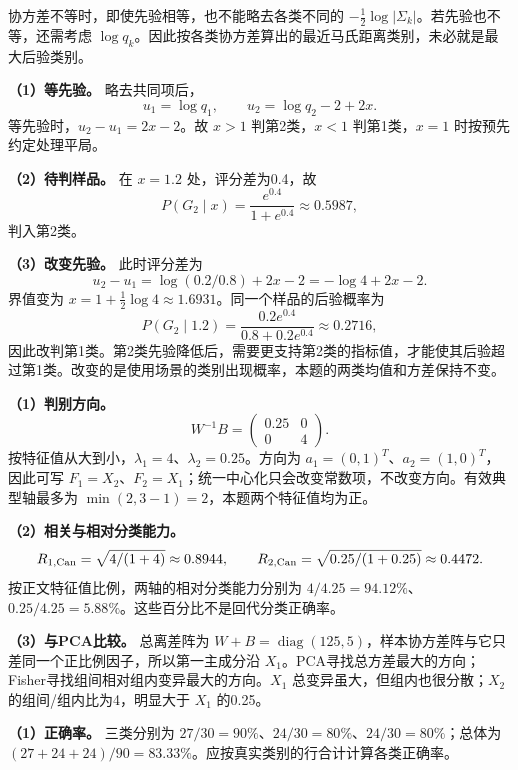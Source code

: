 协方差不等时，即使先验相等，也不能略去各类不同的 \(-\tfrac12\log|\Sigma_k|\)。若先验也不等，还需考虑 \(\log q_k\)。因此按各类协方差算出的最近马氏距离类别，未必就是最大后验类别。





\textbf{（1）等先验。} 略去共同项后， \[u_1=\log q_1,\qquad u_2=\log q_2-2+2x.\] 等先验时，\(u_2-u_1=2x-2\)。故 \(x>1\) 判第2类，\(x<1\) 判第1类，\(x=1\) 时按预先约定处理平局。

\textbf{（2）待判样品。} 在 \(x=1.2\) 处，评分差为0.4，故 \[P(G_2\mid x)=\frac{e^{0.4}}{1+e^{0.4}}\approx0.5987,\] 判入第2类。

\textbf{（3）改变先验。} 此时评分差为 \[u_2-u_1=\log(0.2/0.8)+2x-2=-\log4+2x-2.\] 界值变为 \(x=1+\tfrac12\log4\approx1.6931\)。同一个样品的后验概率为 \[P(G_2\mid1.2)=\frac{0.2e^{0.4}}{0.8+0.2e^{0.4}}\approx0.2716,\] 因此改判第1类。第2类先验降低后，需要更支持第2类的指标值，才能使其后验超过第1类。改变的是使用场景的类别出现概率，本题的两类均值和方差保持不变。





\textbf{（1）判别方向。} \[W^{-1}B=\begin{pmatrix}0.25&0\\0&4\end{pmatrix}.\] 按特征值从大到小，\(\lambda_1=4\)、\(\lambda_2=0.25\)。方向为 \(a_1=(0,1)^T\)、\(a_2=(1,0)^T\)，因此可写 \(F_1=X_2\)、\(F_2=X_1\)；统一中心化只会改变常数项，不改变方向。有效典型轴最多为 \(\min(2,3-1)=2\)，本题两个特征值均为正。

\textbf{（2）相关与相对分类能力。} \[R_{1,\rm Can}=\sqrt{4/(1+4)}\approx0.8944,\qquad
R_{2,\rm Can}=\sqrt{0.25/(1+0.25)}\approx0.4472.\] 按正文特征值比例，两轴的相对分类能力分别为 \(4/4.25=94.12\%\)、\(0.25/4.25=5.88\%\)。这些百分比不是回代分类正确率。

\textbf{（3）与PCA比较。} 总离差阵为 \(W+B=\operatorname{diag}(125,5)\)，样本协方差阵与它只差同一个正比例因子，所以第一主成分沿 \(X_1\)。PCA寻找总方差最大的方向；Fisher寻找组间相对组内变异最大的方向。\(X_1\) 总变异虽大，但组内也很分散；\(X_2\) 的组间/组内比为4，明显大于 \(X_1\) 的0.25。





\textbf{（1）正确率。} 三类分别为 \(27/30=90\%\)、\(24/30=80\%\)、\(24/30=80\%\)；总体为 \((27+24+24)/90=83.33\%\)。应按真实类别的行合计计算各类正确率。

